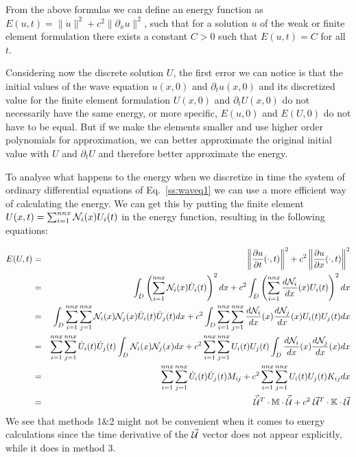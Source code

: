 From the above formulas we can define an energy function as $E(u,t)=\|\dot{u}\|^2  + c^2 \| \partial_x u \|^2 $, such that for a solution $u$ of the weak or finite element formulation there exists a constant $C>0$ 
such that $E(u,t)=C$ for all $t$.

Considering now the discrete solution $U$, the first error we can notice is that the initial values of the wave equation $u(x,0)$ and $\partial_t u(x,0)$ and its discretized value for the finite element formulation 
$U(x,0)$ and $\partial_t U(x,0)$ do not necessarily have the same energy,
or more specific, $E(u,0)$ and $E(U,0)$ do not have to be equal. But if we make the elements smaller and use
higher order polynomials for approximation, we can better approximate the original initial value with $U$ and
$\partial_t U$ and therefore better approximate the energy.

To analyse what happens to the energy when we discretize in time the system of ordinary differential equations
of Eq.~\eqref{ss:waveq1} we can use a more efficient way of calculating the energy. We can get this by putting the finite element $U(x,t)=\sum_{i=1}^{nnx} {\mathcal{N}}_i(x) U_i(t)$ in the energy function, resulting in the following equations:

\begin{eqnarray}
E(U,t) 
&=& \left\|  \frac{\partial u}{\partial t} (\cdot, t)  \right\|^2 + 
c^2 \left\|  \frac{\partial u}{\partial x} (\cdot, t)  \right\|^2 \nonumber\\
&=& \int_D \left( \sum_{i=1}^{nnx} {\mathcal{N}}_i(x) \dot{U}_i(t) \right)^2 dx 
+ c^2 \int_D \left( \sum_{i=1}^{nnx} \frac{d {\mathcal{N}}_i}{dx}(x) U_i(t) \right)^2 dx \nonumber\\
&=& \int_D \sum_{i=1}^{nnx}\sum_{j=1}^{nnx} {\mathcal{N}}_i(x) {\mathcal{N}}_j(x) \dot{U}_i(t) \dot{U}_j(t) dx
+ c^2 \int_D \sum_{i=1}^{nnx}\sum_{j=1}^{nnx} \frac{d {\mathcal{N}}_i}{dx}(x) \frac{d {\mathcal{N}}_j}{dx}(x) U_i(t) U_j(t) dx\nonumber\\
&=& \sum_{i=1}^{nnx}\sum_{j=1}^{nnx} \dot{U}_i(t) \dot{U}_j(t)  \int_D  {\mathcal{N}}_i(x) {\mathcal{N}}_j(x) dx
+ c^2 \sum_{i=1}^{nnx}\sum_{j=1}^{nnx} U_i(t) U_j(t) \int_D  \frac{d {\mathcal{N}}_i}{dx}(x) \frac{d {\mathcal{N}}_j}{dx}(x)  dx\nonumber\\
&=& \sum_{i=1}^{nnx}\sum_{j=1}^{nnx} \dot{U}_i(t) \dot{U}_j(t) M_{ij} 
+ c^2 \sum_{i=1}^{nnx}\sum_{j=1}^{nnx} U_i(t) U_j(t) K_{ij} dx \nonumber\\
&=& \vec{\dot{{\cal U}}}^T \cdot {\mathbb{M}} \cdot \vec{\dot{{\cal U}}} 
+ c^2 \; \vec{\cal U}^T \cdot {\mathbb{K}} \cdot \vec{\cal U}
\end{eqnarray}
We see that methods 1\&2 might not be convenient when it comes to energy calculations since 
the time derivative of the $\vec{\cal U}$ vector does not appear explicitly, while it does
in method 3.

